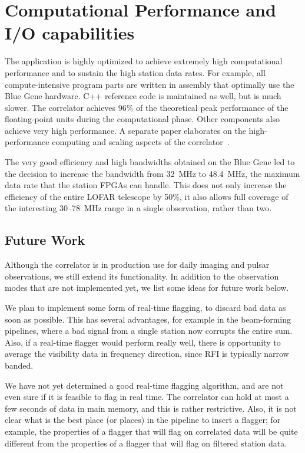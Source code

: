 \section{Computational Performance and I/O capabilities}

The application is highly optimized to achieve extremely high computational
performance and to sustain the high station data rates.
For example, all compute-intensive program parts are written in assembly
that optimally use the Blue Gene hardware.
C++ reference code is maintained as well, but is much slower.
The correlator achieves 96\% of the theoretical peak performance
of the floating-point units during the computational phase.
Other components also achieve very high performance.
A separate paper elaborates on the high-performance computing and scaling
aspects of the correlator~\cite{Romein:10a}.

The very good efficiency and high bandwidths obtained on the Blue Gene led
to the decision to increase the bandwidth from 32~MHz to 48.4~MHz, the
maximum data rate that the station FPGAs can handle.
This does not only increase the efficiency of the entire LOFAR telescope
by 50\%, it also allows full coverage of the interesting 30--78~MHz range
in a single observation, rather than two.


\subsection{Future Work}

Although the correlator is in production use for daily imaging and pulsar
observations, we still extend its functionality.
In addition to the observation modes that are not implemented yet, we list
some ideas for future work below.

We plan to implement some form of real-time flagging, to discard bad data
as soon as possible.
This has several advantages, for example in the beam-forming pipelines,
where a bad signal from a single station now corrupts the entire sum.
Also, if a real-time flagger would perform really well, there is opportunity
to average the visibility data in frequency direction, since RFI is typically
narrow banded.

We have not yet determined a good real-time flagging algorithm, and are not
even sure if it is feasible to flag in real time.
The correlator can hold at most a few seconds of data in main memory, and
this is rather restrictive.
Also, it is not clear what is the best place (or places) in the pipeline to
insert a flagger; for example, the properties of a flagger that will flag
on correlated data will be quite different from the properties of a flagger
that will flag on filtered station data.

